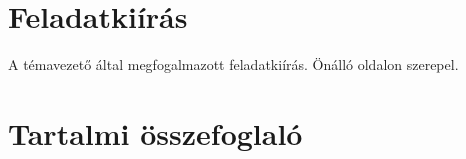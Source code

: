 \documentclass[12pt]{report}
\theoremstyle{definition}
\begin{document}
    \onehalfspacing



    \tableofcontents




    \chapter*{Feladatkiírás}

A témavezető által megfogalmazott feladatkiírás. Önálló oldalon szerepel.



    \chapter*{Tartalmi összefoglaló}


\end{document}
